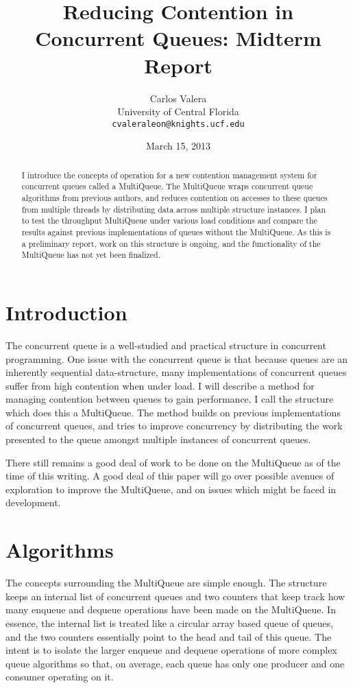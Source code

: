 \documentclass[12pt]{report}
\begin{document}
\title{Reducing Contention in Concurrent Queues: Midterm Report}
\author{Carlos Valera \\
    University of Central Florida \\
    \texttt{cvaleraleon@knights.ucf.edu}}
\date{March 15, 2013}
\maketitle
\begin{abstract}
I introduce the concepts of operation for a new contention management system
for concurrent queues called a MultiQueue. The MultiQueue wraps concurrent
queue algorithms from previous authors, and reduces contention on accesses to
these queues from multiple threads by distributing data across multiple
structure instances. I plan to test the throughput MultiQueue under various
load conditions and compare the results against previous implementations of
queues without the MultiQueue.  As this is a preliminary report, work on this
structure is ongoing, and the functionality of the MultiQueue has not yet been
finalized.
\end{abstract}
\section{Introduction}
The concurrent queue is a well-studied and practical structure in concurrent
programming. One issue with the concurrent queue is that because queues are an
inherently sequential data-structure, many implementations of concurrent queues
suffer from high contention when under load. I will describe a method for
managing contention between queues to gain performance. I call the structure
which does this a MultiQueue. The method builds on previous implementations of
concurrent queues, and tries to improve concurrency by distributing the work
presented to the queue amongst multiple instances of concurrent queues.

There still remains a good deal of work to be done on the MultiQueue as of the
time of this writing. A good deal of this paper will go over possible avenues
of exploration to improve the MultiQueue, and on issues which might be faced in
development.

\section{Algorithms}
The concepts surrounding the MultiQueue are simple enough. The structure keeps
an internal list of concurrent queues and two counters that keep track how many
enqueue and dequeue operations have been made on the MultiQueue. In essence,
the internal list is treated like a circular array based queue of queues, and
the two counters essentially point to the head and tail of this queue. The
intent is to isolate the larger enqueue and dequeue operations of more complex
queue algorithms so that, on average, each queue has only one producer and one
consumer operating on it.
\end{document}
